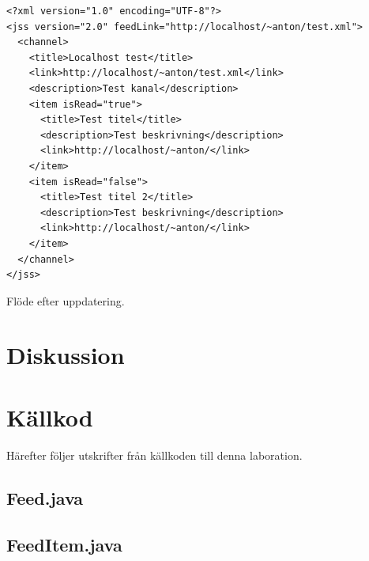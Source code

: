 \documentclass[titlepage, twoside, a4paper, 12pt]{article}
\begin{document}
\begin{program}
\begin{footnotesize}
\begin{verbatim}
<?xml version="1.0" encoding="UTF-8"?>
<jss version="2.0" feedLink="http://localhost/~anton/test.xml">
  <channel>
    <title>Localhost test</title>
    <link>http://localhost/~anton/test.xml</link>
    <description>Test kanal</description>
    <item isRead="true">
      <title>Test titel</title>
      <description>Test beskrivning</description>
      <link>http://localhost/~anton/</link>
    </item>
    <item isRead="false">
      <title>Test titel 2</title>
      <description>Test beskrivning</description>
      <link>http://localhost/~anton/</link>
    </item>
  </channel>
</jss>
\end{verbatim}
\end{footnotesize}
\caption{Flöde efter uppdatering.}
\label{verb:jss-xml}
\end{program}

\section{Diskussion}\label{Diskussion}


\newpage
\appendix
{}
\section{Källkod}\label{Kallkod}
Härefter följer utskrifter från källkoden till denna laboration.

\subsection{Feed.java}\label{Feed.java}
\begin{footnotesize}
  
\end{footnotesize}

\newpage
\subsection{FeedItem.java}\label{FeedItem.java}
\begin{footnotesize}
  
\end{footnotesize}
\end{document}

